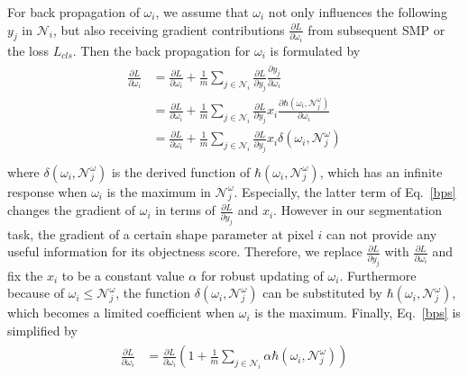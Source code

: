 For back propagation of $\omega_i$, we assume that $\omega_{i}$ not only influences the following $y_{j}$ in $\mathcal{N}_{i}$, but also receiving gradient contributions $\frac{\partial L}{\partial \omega_{i}}$ from subsequent SMP or the loss $L_{cls}$.
Then the back propagation for $\omega_{i}$ is formulated by
%
\begin{eqnarray}\label{bps}
\begin{aligned}
\frac{\partial L}{\partial \omega_{i}}&=\frac{\partial L}{\partial \omega_{i}}+\frac{1}{m}\sum_{j\in\mathcal{N}_{i}}\frac{\partial L}{\partial y_{j}}\frac{\partial y_{j}}{\partial \omega_{i}}\\
&=\frac{\partial L}{\partial \omega_{i}}+\frac{1}{m}\sum_{j\in\mathcal{N}_{i}}\frac{\partial L}{\partial y_{j}}x_{i}\frac{\partial \hbar(\omega_{i},\mathcal{N}^{\omega}_{j})}{\partial \omega_{i}}\\
&=\frac{\partial L}{\partial \omega_{i}}+\frac{1}{m}\sum_{j\in\mathcal{N}_{i}}\frac{\partial L}{\partial y_{j}}x_{i}\delta(\omega_{i},\mathcal{N}^{\omega}_{j})\\
\end{aligned}
\end{eqnarray}
where $\delta(\omega_{i},\mathcal{N}^{\omega}_{j})$ is the derived function of $\hbar(\omega_{i},\mathcal{N}^{\omega}_{j})$, which has an infinite response when $\omega_{i}$ is the maximum in $\mathcal{N}^{\omega}_{j}$.
Especially, the latter term of Eq.~\ref{bps} changes the gradient of $\omega_{i}$ in terms of $\frac{\partial L}{\partial y_{j}}$ and $x_i$.
However in our segmentation task, the gradient of a certain shape parameter at pixel $i$ can not provide any useful information for its objectness score.
Therefore, we replace $\frac{\partial L}{\partial y_{j}}$ with $\frac{\partial L}{\partial \omega_{i}}$ and fix the $x_i$ to be a constant value $\alpha$ for robust updating of $\omega_{i}$.
Furthermore because of $\omega_i\leq\mathcal{N}^{\omega}_{j}$, the function $\delta(\omega_{i},\mathcal{N}^{\omega}_{j})$ can be substituted by $\hbar(\omega_{i},\mathcal{N}^{\omega}_{j})$, which becomes a limited coefficient when $\omega_{i}$ is the maximum.
Finally, Eq.~\ref{bps} is simplified by
\begin{eqnarray}\label{dG}
\begin{aligned}
\frac{\partial L}{\partial \omega_{i}}&=\frac{\partial L}{\partial \omega_{i}}(1+\frac{1}{m}\sum_{j\in\mathcal{N}_{i}}\alpha \hbar(\omega_{i},\mathcal{N}^{\omega}_{j}))\\
\end{aligned}
\end{eqnarray}


